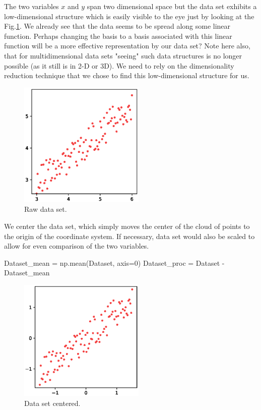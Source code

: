 \documentclass[10pt,twocolumn]{article}
\begin{document}
The two variables $x$ and $y$ span two dimensional space but the data set exhibits a low-dimensional structure which is easily visible to the eye just by looking at the Fig.\ref{fig:python-raw-data}. We already see that the data seems to be spread along some linear function. Perhaps changing the basis to a basis associated with this linear function will be a more effective representation by our data set? Note here also, that for multidimensional data sets "seeing" such data structures is no longer possible (as it still is in 2-D or 3D). We need to rely on the dimensionality reduction technique that we chose to find this low-dimensional structure for us.

\begin{figure}[H]
\centering\includegraphics[width=6cm]{python-raw-data.eps}
\caption{Raw data set.}
\label{fig:python-raw-data}
\end{figure}

We center the data set, which simply moves the center of the cloud of points to the origin of the coordinate system. If necessary, data set would also be scaled to allow for even comparison of the two variables.

\begin{python}
Dataset_mean = np.mean(Dataset, axis=0)
Dataset_proc = Dataset - Dataset_mean
\end{python}

\begin{figure}[H]
\centering\includegraphics[width=6cm]{python-data-centered.eps}
\caption{Data set centered.}
\label{fig:python-raw-data-centered}
\end{figure}
\end{document}
